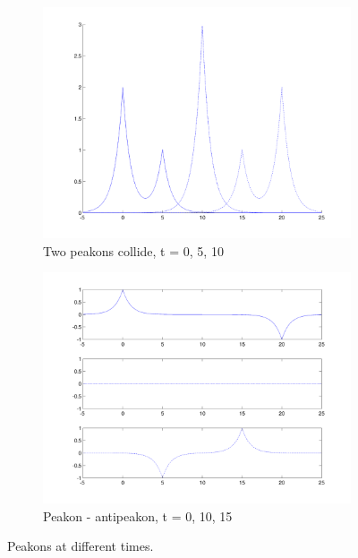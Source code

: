 \begin{figure}[h]
\begin{subfigure}[b]{0.49\textwidth}
                \includegraphics[width=\textwidth]{gfx/peakonovertake}
                \caption{Two peakons collide, t = 0, 5, 10}
                \label{fig:peakonovertake}
        \end{subfigure}
        \begin{subfigure}[b]{0.49\textwidth}
                \includegraphics[width=\textwidth]{gfx/peakonantipeakon}
                \caption{Peakon - antipeakon, t = 0, 10, 15}
                \label{fig:peakonantipeakon}
        \end{subfigure}
        \caption{Peakons at different times.}
\end{figure}